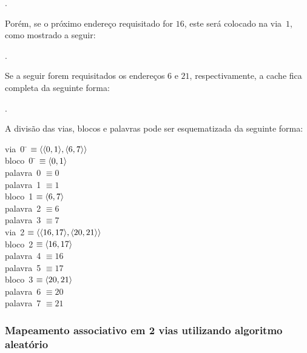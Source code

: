 \begin{center}
  .
\end{center}

Porém, se o próximo endereço requisitado for $16$, este será colocado
na via~$1$, como mostrado a seguir:

\begin{center}
  .
\end{center}

Se a seguir forem requisitados os endereços $6$ e $21$,
respectivamente, a cache fica completa da seguinte forma:

\begin{center}
  .
\end{center}

A divisão das vias, blocos e palavras pode ser esquematizada da seguinte forma:

\begin{tabbing}
 via~0 \= $\equiv \langle\langle 0,1\rangle,\langle 6,7\rangle\rangle$\\
 \>bloco~0 \= $\equiv \langle 0,1\rangle$\\
 \>\>palavra~0 $\equiv 0$\\
 \>\>palavra~1 $\equiv 1$\\
 \>bloco~1 $\equiv \langle 6,7\rangle$\\
\>\>palavra~2 $\equiv 6$\\
 \>\>palavra~3 $\equiv 7$\\
  
via~2 $\equiv \langle\langle 16,17\rangle,\langle 20,21\rangle\rangle$\\
 \>bloco~2 $\equiv \langle 16,17\rangle$\\
\>\>palavra~4 $\equiv 16$\\
 \>\>palavra~5 $\equiv 17$\\
  
\>bloco~3 $\equiv \langle 20,21\rangle$\\
\>\>palavra~6 $\equiv 20$\\
 \>\>palavra~7 $\equiv 21$\\
\end{tabbing}


\newpage
\subsubsection*{Mapeamento associativo em 2 vias utilizando algoritmo aleatório}
\label{2-way:lru}

\setcounter{themiss}{0}
\setcounter{thehit}{0}
\def\tdist{8cm}


